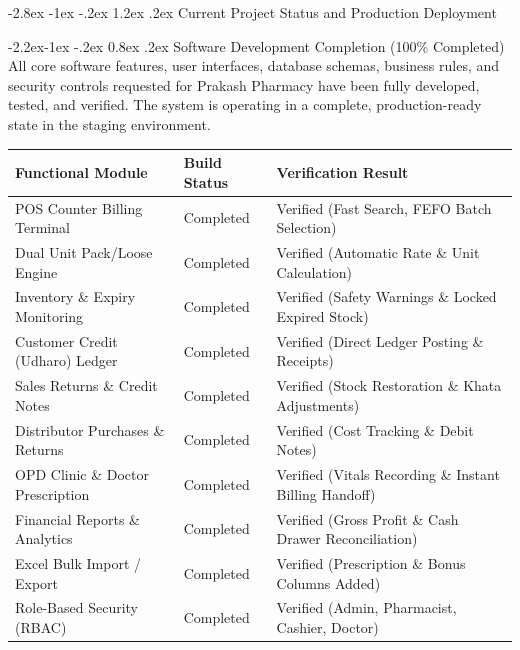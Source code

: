 \documentclass[11pt,a4paper]{article}
\makeatletter
\renewcommand\section{\@startsection {section}{1}{\z@}%
                                   {-2.8ex \@plus -1ex \@minus -.2ex}%
                                   {1.2ex \@plus.2ex}%
                                   {\normalfont\Large\bfseries\color{HeaderNavy}}}
\renewcommand\subsection{\@startsection{subsection}{2}{\z@}%
                                     {-2.2ex\@plus -1ex \@minus -.2ex}%
                                     {0.8ex \@plus .2ex}%
                                     {\normalfont\large\bfseries\color{SubHeader}}}
\makeatother
\begin{document}
\section{Current Project Status and Production Deployment}

\subsection{Software Development Completion (100\% Completed)}
All core software features, user interfaces, database schemas, business rules, and security controls requested for Prakash Pharmacy have been fully developed, tested, and verified. The system is operating in a complete, production-ready state in the staging environment.

\begin{center}
\begin{tabularx}{\textwidth}{p{5.2cm}p{3.5cm}X}
\toprule
\textbf{Functional Module} & \textbf{Build Status} & \textbf{Verification Result} \\
\midrule
POS Counter Billing Terminal & Completed & Verified (Fast Search, FEFO Batch Selection) \\
Dual Unit Pack/Loose Engine & Completed & Verified (Automatic Rate \& Unit Calculation) \\
Inventory \& Expiry Monitoring & Completed & Verified (Safety Warnings \& Locked Expired Stock) \\
Customer Credit (Udharo) Ledger & Completed & Verified (Direct Ledger Posting \& Receipts) \\
Sales Returns \& Credit Notes & Completed & Verified (Stock Restoration \& Khata Adjustments) \\
Distributor Purchases \& Returns & Completed & Verified (Cost Tracking \& Debit Notes) \\
OPD Clinic \& Doctor Prescription & Completed & Verified (Vitals Recording \& Instant Billing Handoff) \\
Financial Reports \& Analytics & Completed & Verified (Gross Profit \& Cash Drawer Reconciliation) \\
Excel Bulk Import / Export & Completed & Verified (Prescription \& Bonus Columns Added) \\
Role-Based Security (RBAC) & Completed & Verified (Admin, Pharmacist, Cashier, Doctor) \\
\bottomrule
\end{tabularx}
\end{center}
\end{document}
